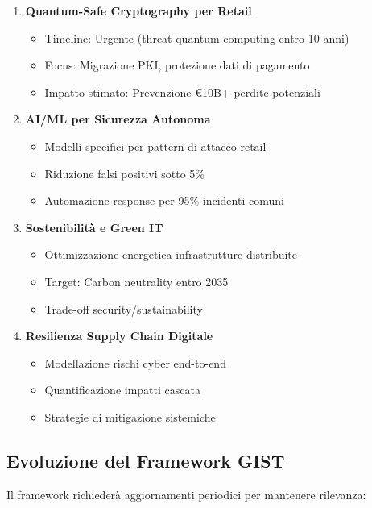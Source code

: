 \begin{enumerate}
\item \textbf{Quantum-Safe Cryptography per Retail}
\begin{itemize}
\item Timeline: Urgente (threat quantum computing entro 10 anni)
\item Focus: Migrazione PKI, protezione dati di pagamento
\item Impatto stimato: Prevenzione €10B+ perdite potenziali
\end{itemize}

\item \textbf{AI/ML per Sicurezza Autonoma}
\begin{itemize}
\item Modelli specifici per pattern di attacco retail
\item Riduzione falsi positivi sotto 5\%
\item Automazione response per 95\% incidenti comuni
\end{itemize}

\item \textbf{Sostenibilità e Green IT}
\begin{itemize}
\item Ottimizzazione energetica infrastrutture distribuite
\item Target: Carbon neutrality entro 2035
\item Trade-off security/sustainability
\end{itemize}

\item \textbf{Resilienza Supply Chain Digitale}
\begin{itemize}
\item Modellazione rischi cyber end-to-end
\item Quantificazione impatti cascata
\item Strategie di mitigazione sistemiche
\end{itemize}
\end{enumerate}

\subsection{Evoluzione del Framework GIST}

Il framework richiederà aggiornamenti periodici per mantenere rilevanza:

